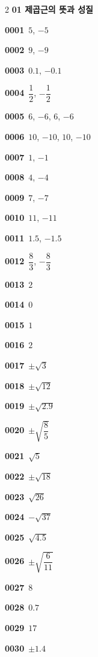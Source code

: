 \documentclass[10pt,a4paper]{article}
\begin{document}
\begin{multicols}{2}\small
\noindent\textbf{01 제곱근의 뜻과 성질}\par\smallskip
\noindent\textbf{0001}\ $5$, $-5$\par
\noindent\textbf{0002}\ $9$, $-9$\par
\noindent\textbf{0003}\ $0.1$, $-0.1$\par
\noindent\textbf{0004}\ $\dfrac{1}{2}$, $-\dfrac{1}{2}$\par
\noindent\textbf{0005}\ $6$, $-6$, $6$, $-6$\par
\noindent\textbf{0006}\ $10$, $-10$, $10$, $-10$\par
\noindent\textbf{0007}\ $1$, $-1$\par
\noindent\textbf{0008}\ $4$, $-4$\par
\noindent\textbf{0009}\ $7$, $-7$\par
\noindent\textbf{0010}\ $11$, $-11$\par
\noindent\textbf{0011}\ $1.5$, $-1.5$\par
\noindent\textbf{0012}\ $\dfrac{8}{3}$, $-\dfrac{8}{3}$\par
\noindent\textbf{0013}\ $2$\par
\noindent\textbf{0014}\ $0$\par
\noindent\textbf{0015}\ $1$\par
\noindent\textbf{0016}\ $2$\par
\noindent\textbf{0017}\ $\pm\sqrt{3}$\par
\noindent\textbf{0018}\ $\pm\sqrt{12}$\par
\noindent\textbf{0019}\ $\pm\sqrt{2.9}$\par
\noindent\textbf{0020}\ $\pm\sqrt{\dfrac{8}{5}}$\par
\noindent\textbf{0021}\ $\sqrt{5}$\par
\noindent\textbf{0022}\ $\pm\sqrt{18}$\par
\noindent\textbf{0023}\ $\sqrt{26}$\par
\noindent\textbf{0024}\ $-\sqrt{37}$\par
\noindent\textbf{0025}\ $\sqrt{4.5}$\par
\noindent\textbf{0026}\ $\pm\sqrt{\dfrac{6}{11}}$\par
\noindent\textbf{0027}\ $8$\par
\noindent\textbf{0028}\ $0.7$\par
\noindent\textbf{0029}\ $17$\par
\noindent\textbf{0030}\ $\pm 1.4$\par

\end{multicols}
\end{document}
